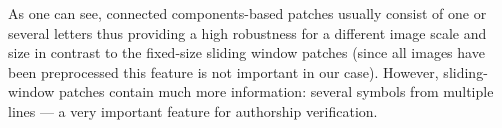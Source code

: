 \documentclass[conference,a4paper]{ieeetran}
\begin{document}
As one can see, connected components-based patches usually consist of one or several letters thus providing a high robustness for a different image scale and size in contrast to the fixed-size sliding window patches (since all images have been preprocessed this feature is not important in our case). However, sliding-window patches contain much more information: several symbols from multiple lines --- a very important feature for authorship verification.
%

\end{document}
